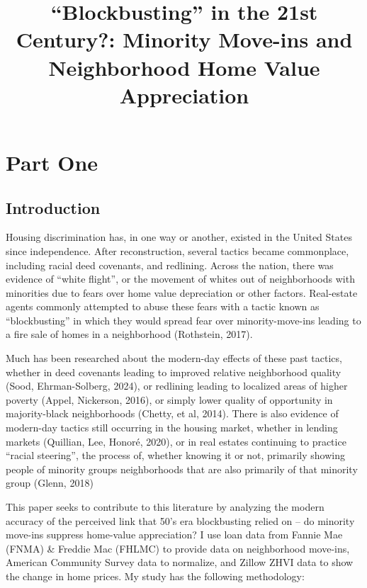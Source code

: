 \documentclass[11pt]{article}
\title{``Blockbusting'' in the 21st Century?: Minority Move-ins and
    Neighborhood Home Value
    Appreciation}
\begin{document}
    
    \maketitle
    
    

    
   
    \section{Part One}\label{part-one}

    \subsection{Introduction}\label{introduction}

    Housing discrimination has, in one way or another, existed in the United
States since independence. After reconstruction, several tactics became
commonplace, including racial deed covenants, and redlining. Across the
nation, there was evidence of ``white flight'', or the movement of
whites out of neighborhoods with minorities due to fears over home value
depreciation or other factors. Real-estate agents commonly attempted to
abuse these fears with a tactic known as ``blockbusting'' in which they
would spread fear over minority-move-ins leading to a fire sale of homes
in a neighborhood (Rothstein, 2017).

Much has been researched about the modern-day effects of these past
tactics, whether in deed covenants leading to improved relative
neighborhood quality (Sood, Ehrman-Solberg, 2024), or redlining leading
to localized areas of higher poverty (Appel, Nickerson, 2016), or simply
lower quality of opportunity in majority-black neighborhoods (Chetty, et
al, 2014). There is also evidence of modern-day tactics still occurring
in the housing market, whether in lending markets (Quillian, Lee,
Honoré, 2020), or in real estates continuing to practice ``racial
steering'', the process of, whether knowing it or not, primarily showing
people of minority groups neighborhoods that are also primarily of that
minority group (Glenn, 2018)

This paper seeks to contribute to this literature by analyzing the
modern accuracy of the perceived link that 50's era blockbusting relied
on -- do minority move-ins suppress home-value appreciation? I use loan
data from Fannie Mae (FNMA) \& Freddie Mac (FHLMC) to provide data on
neighborhood move-ins, American Community Survey data to normalize, and
Zillow ZHVI data to show the change in home prices. My study has the
following methodology:
\end{document}
